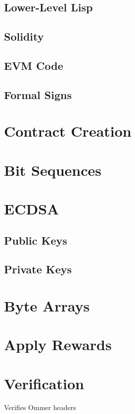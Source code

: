 \documentclass[11pt,a4paper,leqno,bibliography=totoc]{scrartcl}
\newenvironment{alphafootnotes}
    {\par\edef\savedfootnotenumber{\number\value{footnote}}
    \renewcommand{\thefootnote}{\alph{footnote}}
     \setcounter{footnote}{0}}
    {\par\setcounter{footnote}{\savedfootnotenumber}}
\begin{document}
\begin{alphafootnotes}
\begin{multicols}{2}
\subsection{Lower-Level Lisp}

\subsection{Solidity}

\subsection{EVM Code}

\subsection{Formal Signs}

\section{Contract Creation}

\section{Bit Sequences}
\columnbreak


\section{ECDSA}
\subsection{Public Keys}
\subsection{Private Keys}

\section{Byte Arrays}


    \section{Apply Rewards}

    \section{Verification}
    Verifies Ommer headers


\end{multicols}
\end{alphafootnotes}
\end{document}
